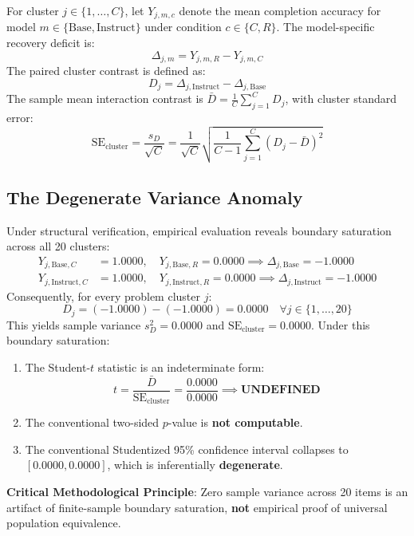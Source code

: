 \documentclass[11pt,letterpaper]{article}
\begin{document}
For cluster $j \in \{1, \dots, C\}$, let $Y_{j, m, c}$ denote the mean completion accuracy for model $m \in \{\text{Base}, \text{Instruct}\}$ under condition $c \in \{C, R\}$. The model-specific recovery deficit is:
\begin{equation}
\Delta_{j, m} = Y_{j, m, R} - Y_{j, m, C}
\end{equation}
The paired cluster contrast is defined as:
\begin{equation}
D_j = \Delta_{j, \text{Instruct}} - \Delta_{j, \text{Base}}
\end{equation}
The sample mean interaction contrast is $\bar{D} = \frac{1}{C}\sum_{j=1}^{C} D_j$, with cluster standard error:
\begin{equation}
\mathrm{SE}_{\text{cluster}} = \frac{s_D}{\sqrt{C}} = \frac{1}{\sqrt{C}} \sqrt{\frac{1}{C-1}\sum_{j=1}^{C}(D_j - \bar{D})^2}
\end{equation}

\subsection{The Degenerate Variance Anomaly}
Under structural verification, empirical evaluation reveals boundary saturation across all 20 clusters:
\begin{align}
Y_{j, \text{Base}, C} &= 1.0000, \quad Y_{j, \text{Base}, R} = 0.0000 \implies \Delta_{j, \text{Base}} = -1.0000 \\
Y_{j, \text{Instruct}, C} &= 1.0000, \quad Y_{j, \text{Instruct}, R} = 0.0000 \implies \Delta_{j, \text{Instruct}} = -1.0000
\end{align}
Consequently, for every problem cluster $j$:
\begin{equation}
D_j = (-1.0000) - (-1.0000) = 0.0000 \quad \forall j \in \{1, \dots, 20\}
\end{equation}
This yields sample variance $s_D^2 = 0.0000$ and $\mathrm{SE}_{\text{cluster}} = 0.0000$. Under this boundary saturation:
\begin{enumerate}
    \item The Student-$t$ statistic is an indeterminate form:
    \begin{equation}
    t = \frac{\bar{D}}{\mathrm{SE}_{\text{cluster}}} = \frac{0.0000}{0.0000} \implies \textbf{UNDEFINED}
    \end{equation}
    \item The conventional two-sided $p$-value is \textbf{not computable}.
    \item The conventional Studentized 95\% confidence interval collapses to $[0.0000, 0.0000]$, which is inferentially \textbf{degenerate}.
\end{enumerate}
\textbf{Critical Methodological Principle}: Zero sample variance across 20 items is an artifact of finite-sample boundary saturation, \textbf{not} empirical proof of universal population equivalence.
\end{document}
